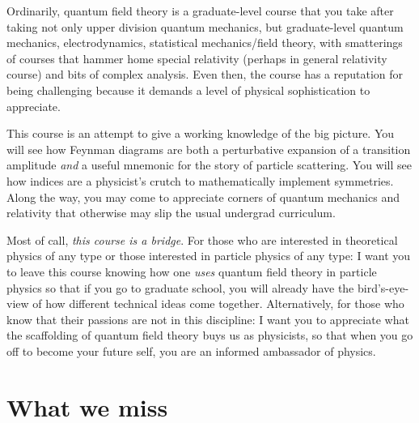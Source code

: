 \documentclass[12pt, oneside]{report}    %
\let\oldsection\section
\def\section{%
  \setcounter{sidenote}{1}%
  \oldsection
}
\begin{document}
Ordinarily, quantum field theory is a graduate-level course that you take after taking not only upper division quantum mechanics, but graduate-level quantum mechanics, electrodynamics, statistical mechanics/field theory, with smatterings of courses that hammer home special relativity (perhaps in general relativity course) and bits of complex analysis. Even then, the course has a reputation for being challenging because it demands a level of physical sophistication to appreciate. 

This course is an attempt to give a working knowledge of the big picture. You will see how Feynman diagrams are both a perturbative expansion of a transition amplitude \emph{and} a useful mnemonic for the story of particle scattering. You will see how indices are a physicist's crutch to mathematically implement symmetries. Along the way, you may come to appreciate corners of quantum mechanics and relativity that otherwise may slip the usual undergrad curriculum. 

Most of call, \emph{this course is a bridge}. For those who are interested in theoretical physics of any type or those interested in particle physics of any type: I want you to leave this course knowing how one \emph{uses} quantum field theory in particle physics so that if you go to graduate school, you will already have the bird's-eye-view of how different technical ideas come together. Alternatively, for those who know that their passions are not in this discipline: I want you to appreciate what the scaffolding of quantum field theory buys us as physicists, so that when you go off to become your future self, you are an informed ambassador of physics.

\section{What we miss}
\end{document}
